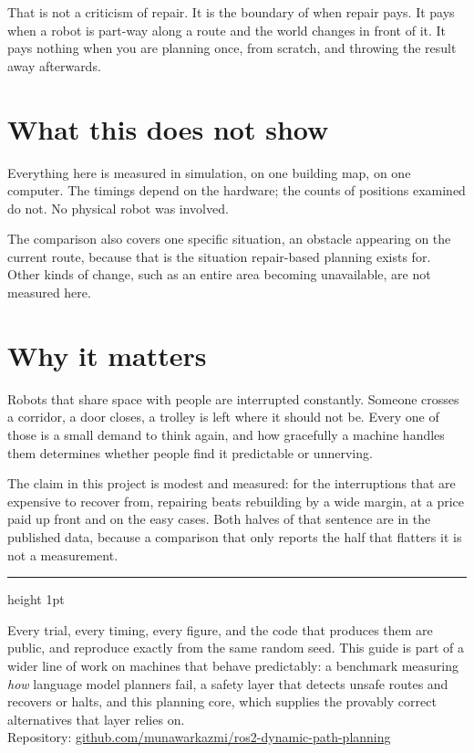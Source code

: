 \documentclass[11pt,a4paper]{article}
\begin{document}
That is not a criticism of repair. It is the boundary of when repair pays. It pays when a robot is part-way along a route and the world changes in front of it. It pays nothing when you are planning once, from scratch, and throwing the result away afterwards.

\section{What this does not show}

Everything here is measured in simulation, on one building map, on one computer. The timings depend on the hardware; the counts of positions examined do not. No physical robot was involved.

The comparison also covers one specific situation, an obstacle appearing on the current route, because that is the situation repair-based planning exists for. Other kinds of change, such as an entire area becoming unavailable, are not measured here.

\section{Why it matters}

Robots that share space with people are interrupted constantly. Someone crosses a corridor, a door closes, a trolley is left where it should not be. Every one of those is a small demand to think again, and how gracefully a machine handles them determines whether people find it predictable or unnerving.

The claim in this project is modest and measured: for the interruptions that are expensive to recover from, repairing beats rebuilding by a wide margin, at a price paid up front and on the easy cases. Both halves of that sentence are in the published data, because a comparison that only reports the half that flatters it is not a measurement.

\vspace{6pt}
{\color{rule}\hrule height 1pt}
\vspace{6pt}

{\small Every trial, every timing, every figure, and the code that produces them are public, and reproduce exactly from the same random seed. This guide is part of a wider line of work on machines that behave predictably: a benchmark measuring \emph{how} language model planners fail, a safety layer that detects unsafe routes and recovers or halts, and this planning core, which supplies the provably correct alternatives that layer relies on.\\
Repository: \href{https://github.com/munawarkazmi/ros2-dynamic-path-planning}{github.com/munawarkazmi/ros2-dynamic-path-planning}}
\end{document}
